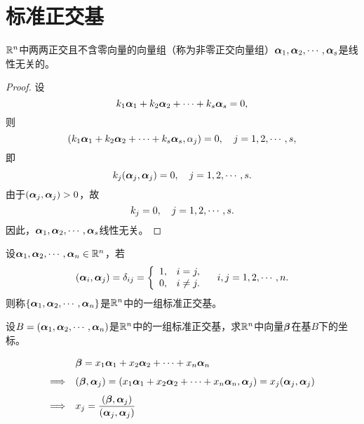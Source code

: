 \section{标准正交基}



\begin{dingli}
  $\mathbb R^n$中两两正交且不含零向量的向量组（称为非零正交向量组）$\boldsymbol{\alpha}_1,\boldsymbol{\alpha}_2,\cdots,\boldsymbol{\alpha}_s$是线性无关的。
\end{dingli}
\begin{proof}
设
$$
k_1\boldsymbol{\alpha}_1+k_2\boldsymbol{\alpha}_2+\cdots+k_s\boldsymbol{\alpha}_s=0,
$$
则
$$
(k_1\boldsymbol{\alpha}_1+k_2\boldsymbol{\alpha}_2+\cdots+k_s\boldsymbol{\alpha}_s,\alpha_j)=0, \quad j=1,2,\cdots,s,
$$
即
$$
k_j(\boldsymbol{\alpha}_j,\boldsymbol{\alpha}_j)=0, \quad j=1,2,\cdots,s.
$$
由于$(\boldsymbol{\alpha}_j,\boldsymbol{\alpha}_j)>0$，故
$$
k_j=0, \quad j=1,2,\cdots,s.
$$
因此，$\boldsymbol{\alpha}_1,\boldsymbol{\alpha}_2,\cdots,\boldsymbol{\alpha}_s$线性无关。
\end{proof}




\begin{dingyi}[标准正交基]
  设$\boldsymbol{\alpha}_1,\boldsymbol{\alpha}_2,\cdots,\boldsymbol{\alpha}_n\in \mathbb R^n$，若
  $$
  (\boldsymbol{\alpha}_i,\boldsymbol{\alpha}_j)=\delta_{ij}=\left\{
    \begin{array}{ll}
      1,& i=j,\\
      0,& i\ne j.
    \end{array}
  \right. \quad i,j=1,2,\cdots,n.
  $$
  则称$\{\boldsymbol{\alpha}_1,\boldsymbol{\alpha}_2,\cdots,\boldsymbol{\alpha}_n\}$是$\mathbb R^n$中的一组标准正交基。
\end{dingyi}






\begin{li}
  设$B=(\boldsymbol{\alpha}_1,\boldsymbol{\alpha}_2,\cdots,\boldsymbol{\alpha}_n)$是$\mathbb R^n$中的一组标准正交基，求$\mathbb R^n$中向量$\boldsymbol{\beta}$在基$B$下的坐标。
\end{li}
\begin{jie}
$$
\begin{array}{rl}
  & \boldsymbol{\beta}=x_1\boldsymbol{\alpha}_1+x_2\boldsymbol{\alpha}_2+\cdots+x_n\boldsymbol{\alpha}_n\\[0.1in]
  \Longrightarrow&   (\boldsymbol{\beta},\boldsymbol{\alpha}_j)=(x_1\boldsymbol{\alpha}_1+x_2\boldsymbol{\alpha}_2+\cdots+x_n\boldsymbol{\alpha}_n,\boldsymbol{\alpha}_j)=x_j(\boldsymbol{\alpha}_j,\boldsymbol{\alpha}_j)\\[0.1in]
  \Longrightarrow& \displaystyle x_j =\frac{ (\boldsymbol{\beta},\boldsymbol{\alpha}_j)}{(\boldsymbol{\alpha}_j,\boldsymbol{\alpha}_j)}
\end{array}
$$
\end{jie}